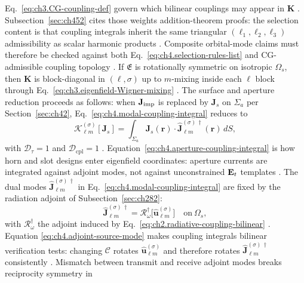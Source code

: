 Eq.~\eqref{eq:ch3.CG-coupling-def} govern which bilinear couplings may appear in
\(\mathbf{K}\) \cite{jackson1999}. Subsection~\ref{sec:ch452} cites those weights
addition-theorem proofs: the selection content is that coupling integrals inherit the same triangular
\((\ell_1,\ell_2,\ell_{3})\) admissibility as scalar harmonic products \cite{hansen1988}. Composite
orbital-mode claims must therefore be checked against both Eq.~\eqref{eq:ch4.selection-rules-list} and CG-admissible coupling
topology \cite{devaney2004}.
\label{prop:ch4.so3-block-sparsity}
If \(\mathfrak{E}\) is rotationally symmetric on isotropic \(\Omega_{s}\), then \(\mathbf{K}\) is block-diagonal in
\((\ell,\sigma)\) up to \(m\)-mixing inside each \(\ell\) block through
Eq.~\eqref{eq:ch3.eigenfield-Wigner-mixing} \cite{jackson1999}. 
The surface and aperture reduction proceeds as follows: when \(\mathbf{J}_{\mathrm{imp}}\) is replaced by \(\mathbf{J}_{s}\) on \(\Sigma_{a}\) per Section~\ref{sec:ch42},
Eq.~\eqref{eq:ch4.modal-coupling-integral} reduces to
\begin{equation}
\label{eq:ch4.aperture-coupling-integral}
\mathcal{K}_{\ell m}^{(\sigma)}[\mathbf{J}_{s}]
=
\int_{\Sigma_{a}}
\mathbf{J}_{s}(\mathbf{r})\cdot
\widehat{\mathbf{J}}_{\ell m}^{(\sigma)\,\dagger}(\mathbf{r})\,
dS,
\end{equation}
with \(\mathcal{D}_{\tau}=1\) and \(\mathcal{D}_{\mathrm{cpl}}=1\) \cite{stratton1941}.
Equation~\eqref{eq:ch4.aperture-coupling-integral} is how horn and slot designs enter eigenfield coordinates: aperture
currents are integrated against adjoint modes, not against unconstrained \(\mathbf{E}_{t}\) templates \cite{collin2001}.
The dual modes \(\widehat{\mathbf{J}}_{\ell m}^{(\sigma)\,\dagger}\) in Eq.~\eqref{eq:ch4.modal-coupling-integral} are
fixed by the radiation adjoint of Subsection~\ref{sec:ch282}:
\begin{equation}
\label{eq:ch4.adjoint-source-mode}
\widehat{\mathbf{J}}_{\ell m}^{(\sigma)\,\dagger}
=
\mathcal{R}_\omega^{\dagger}\big[\widehat{\mathbf{u}}_{\ell m}^{(\sigma)}\big]
\quad\text{on}\ \Omega_{s},
\end{equation}
with \(\mathcal{R}_\omega^{\dagger}\) the adjoint induced by
Eq.~\eqref{eq:ch2.radiative-coupling-bilinear} \cite{stratton1941}. Equation
\eqref{eq:ch4.adjoint-source-mode} makes coupling integrals bilinear verification tests: changing \(\mathcal{C}\) rotates
\(\widehat{\mathbf{u}}_{\ell m}^{(\sigma)}\) and therefore rotates \(\widehat{\mathbf{J}}_{\ell m}^{(\sigma)\,\dagger}\)
consistently \cite{hansen1988}. Mismatch between transmit and receive adjoint modes breaks reciprocity symmetry in
